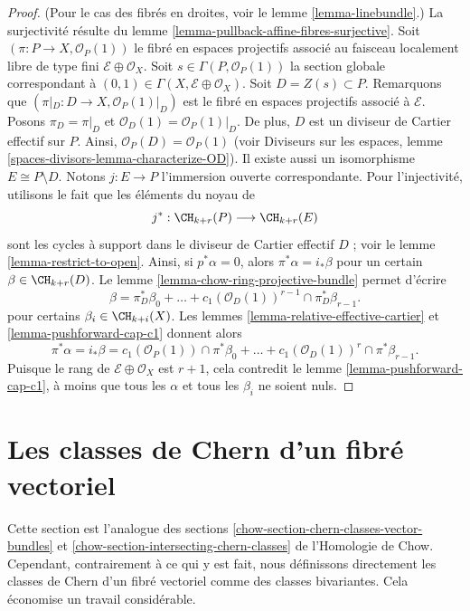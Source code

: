 \begin{proof}
(Pour le cas des fibrés en droites, voir le lemme \ref{lemma-linebundle}.) La
surjectivité résulte du lemme \ref{lemma-pullback-affine-fibres-surjective}.
Soit $(\pi  : P \to X, \mathcal{O}_P(1))$ le fibré en espaces projectifs
associé au faisceau localement libre de type fini $\mathcal{E} \oplus
\mathcal{O}_X$. Soit $s \in \Gamma(P, \mathcal{O}_P(1))$ la section globale
correspondant à $(0, 1) \in \Gamma(X, \mathcal{E} \oplus \mathcal{O}_X)$.
Soit $D = Z(s) \subset P$. Remarquons que $(\pi|_D : D \to X ,
\mathcal{O}_P(1)|_D)$ est le fibré en espaces projectifs associé à
$\mathcal{E}$. Posons $\pi_D = \pi|_D$ et $\mathcal{O}_D(1) =
\mathcal{O}_P(1)|_D$. De plus, $D$ est un diviseur de Cartier effectif sur $P$.
Ainsi, $\mathcal{O}_P(D) = \mathcal{O}_P(1)$ (voir Diviseurs sur les espaces,
lemme \ref{spaces-divisors-lemma-characterize-OD}). Il existe aussi un
isomorphisme $E \cong P \setminus D$. Notons $j : E \to P$ l'immersion ouverte
correspondante. Pour l'injectivité, utilisons le fait que les éléments du noyau
de
$$
j^* :
\CH_{k + r}(P)
\longrightarrow
\CH_{k + r}(E)
$$
sont les cycles à support dans le diviseur de Cartier effectif $D$ ; voir le
lemme \ref{lemma-restrict-to-open}. Ainsi, si $p^*\alpha = 0$, alors
$\pi^*\alpha = i_*\beta$ pour un certain $\beta \in \CH_{k + r}(D)$. Le lemme
\ref{lemma-chow-ring-projective-bundle} permet d'écrire
$$
\beta = \pi_D^*\beta_0 +
\ldots + c_1(\mathcal{O}_D(1))^{r - 1} \cap \pi_D^* \beta_{r - 1}.
$$
pour certains $\beta_i \in \CH_{k + i}(X)$. Les lemmes
\ref{lemma-relative-effective-cartier} et \ref{lemma-pushforward-cap-c1}
donnent alors
$$
\pi^*\alpha = i_*\beta =
c_1(\mathcal{O}_P(1)) \cap \pi^*\beta_0 +
\ldots +
c_1(\mathcal{O}_D(1))^r \cap \pi^*\beta_{r - 1}.
$$
Puisque le rang de $\mathcal{E} \oplus \mathcal{O}_X$ est $r + 1$, cela
contredit le lemme \ref{lemma-pushforward-cap-c1}, à moins que tous les
$\alpha$ et tous les $\beta_i$ ne soient nuls.
\end{proof}








\section{Les classes de Chern d'un fibré vectoriel}
\label{section-chern-classes-vector-bundles}

\noindent
Cette section est l'analogue des sections
\ref{chow-section-chern-classes-vector-bundles} et
\ref{chow-section-intersecting-chern-classes} de l'Homologie de Chow.
Cependant, contrairement à ce qui y est fait, nous définissons directement les
classes de Chern d'un fibré vectoriel comme des classes bivariantes. Cela
économise un travail considérable.

